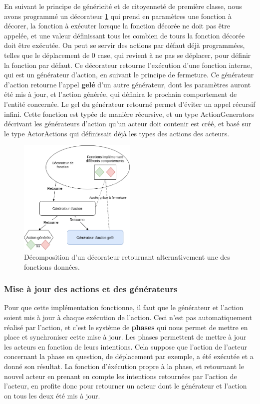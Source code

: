 \documentclass{article}
\begin{document}
En suivant le principe de généricité et de citoyenneté de première classe, nous avons programmé un décorateur \ref{fig:deco_every_n} qui prend en paramètres une fonction à décorer, la fonction à exécuter lorsque la fonction décorée ne doit pas être appelée, et une valeur définissant tous les combien de tours la fonction décorée doit être exécutée. On peut se servir des actions par défaut déjà programmées, telles que le déplacement de 0 case, qui revient à ne pas se déplacer, pour définir la fonction par défaut.
Ce décorateur retourne l'exécution d'une fonction interne, qui est un générateur d'action, en suivant le principe de fermeture. Ce générateur d'action retourne l'appel \textbf{gelé} d'un autre générateur, dont les paramètres auront été mis à jour, et l'action générée, qui définira le prochain comportement de l'entité concernée. Le gel du générateur retourné permet d'éviter un appel récursif infini. Cette fonction est typée de manière récursive, et un type ActionGenerators décrivant les générateurs d'action qu'un acteur doit contenir est créé, et basé sur le type ActorActions qui définissait déjà les types des actions des acteurs.


\begin{figure}[H]
    \centering
    \includegraphics[width = 0.5\textwidth]{diag_deco_every_n.png}
    \caption{Décomposition d'un décorateur retournant alternativement une des fonctions données.}
    \label{fig:deco_every_n}
\end{figure}

\subsubsection{Mise à jour des actions et des générateurs}

Pour que cette implémentation fonctionne, il faut que le générateur et l'action soient mis à jour à chaque exécution de l'action. Ceci n'est pas automatiquement réalisé par l'action, et c'est le système de \textbf{phases} qui nous permet de mettre en place et synchroniser cette mise à jour.
Les phases permettent de mettre à jour les acteurs en fonction de leurs intentions. Cela suppose que l'action de l'acteur concernant la phase en question, de déplacement par exemple, a été exécutée et a donné son résultat. La fonction d'éxécution propre à la phase, et retournant le nouvel acteur en prenant en compte les intentions retournées par l'action de l'acteur, en profite donc pour retourner un acteur dont le générateur et l'action on tous les deux été mis à jour.
\end{document}
